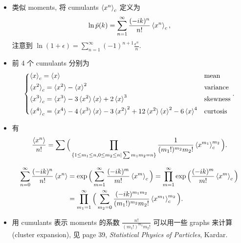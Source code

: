 \begin{itemize}
	\noindent\hdashrule[0.5ex]{\linewidth}{0.5pt}{1mm} %
	
	\item 类似 moments, 将 cumulants $\braket{x^n}_c$ 定义为
	\begin{equation}
		\ln \tilde{p}(k) = \sum_{n = 1}^\infty \frac{(- i k)^n}{n!} \braket{x^n}_c,
	\end{equation}
	注意到 $\ln(1 + \epsilon) = \sum_{n = 1}^\infty (- 1)^{n + 1} \frac{\epsilon^n}{n}$.
	
	\item 前 4 个 cumulants 分别为
	\begin{equation}
		\begin{dcases}
			\braket{x}_c = \braket{x} & \text{mean} \\
			\braket{x^2}_c = \braket{x^2} - \braket{x}^2 & \text{variance} \\
			\braket{x^3}_c = \braket{x^3} - 3 \braket{x^2} \braket{x} + 2 \braket{x}^3 & \text{skewness} \\
			\braket{x^4}_c = \braket{x^4} - 4 \braket{x^3} \braket{x} - 3 \braket{x^2}^2 + 12 \braket{x^2} \braket{x}^2 - 6 \braket{x}^4 & \text{curtosis}
		\end{dcases}.
	\end{equation}
	
	\item 有
	\begin{equation}
		\frac{\braket{x^n}}{n!} = \sum \Big( \prod_{\{1 \leq m_1 \leq n, 0 \leq m_2 \leq n | \sum m_1 m_2 = n\}} \frac{1}{(m_1!)^{m_2} m_2!} \braket{x^{m_1}}_c^{m_2} \Big).
	\end{equation}
	
	\begin{tcolorbox}[title=calculation:]
		\begin{align}
			\sum_{n = 0}^\infty \frac{(- i k)^n}{n!} \braket{x^n} &= \exp \Big( \sum_{m = 1}^\infty \frac{(- i k)^m}{m!} \braket{x^m}_c \Big) = \prod_{m = 1}^\infty \exp \Big( \frac{(- i k)^m}{m!} \braket{x^m}_c \Big) \notag \\
			&= \prod_{m_1 = 1}^\infty \Big( \sum_{m_2 = 0}^\infty \frac{(- i k)^{m_1 m_2}}{(m_1!)^{m_2} m_2!} \braket{x^{m_1}}_c^{m_2} \Big).
		\end{align}
	\end{tcolorbox}
	
	\item 用 cumulants 表示 moments 的系数 $\frac{n!}{(m_1!)^{m_2} m_2!}$ 可以用一些 graphs 来计算 (cluster expansion), 见 page 39, \textit{Statistical Physics of Particles}, Kardar.
\end{itemize}

